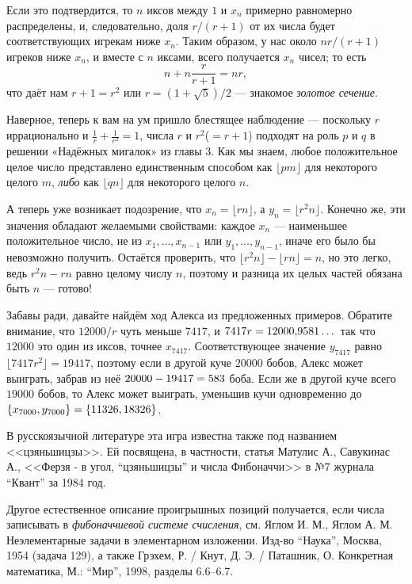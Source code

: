 Если это подтвердится, то $n$ иксов между $1$ и $x_n$ примерно равномерно распределены, и, следовательно, доля $r/(r + 1)$ от их числа будет соответствующих игрекам ниже $x_n$.
Таким образом, у нас около $nr/(r + 1)$ игреков ниже $x_n$, и вместе с $n$ иксами, всего получается $x_n$ чисел; то есть
\[n+n\frac{r}{r+1}=nr,\]
что даёт нам $r + 1 = r^2$ или $r = (1 + \sqrt{5})/2$ --- знакомое \emph{золотое сечение}.

Наверное, теперь к вам на ум пришло блестящее наблюдение --- поскольку $r$ иррационально и $\tfrac1r+\tfrac1{r^2}=1$, числа $r$ и $r^2$($= r + 1$) подходят на роль $p$ и $q$ в решении «Надёжных мигалок» из главы 3.
Как мы знаем, любое положительное целое число представлено единственным способом как $\lfloor pm\rfloor$ для некоторого целого $m$, \emph{либо} как $\lfloor qn\rfloor$ для некоторого целого $n$.

А теперь уже возникает подозрение, что $x_n=\lfloor rn\rfloor$, а $y_n=\lfloor r^2 n\rfloor$.
Конечно же, эти значения обладают желаемыми свойствами:
каждое $x_n$ --- наименьшее положительное число, не из $x_1, \dots , x_{n-1}$ или $y_1, \dots, y_{n-1}$, иначе его было бы невозможно получить.
Остаётся проверить, что $\lfloor r^2 n\rfloor - \lfloor rn\rfloor = n$, но это легко, ведь $r^2 n - rn$ равно целому числу $n$,
поэтому и разница их целых частей обязана быть $n$ --- готово!

Забавы ради, давайте найдём ход Алекса из предложенных примеров.
Обратите внимание, что $12 000/r$ чуть меньше $7417$, и $7417r \z= 12 000{,}9581\dots$ так что $12 000$ это один из иксов, точнее $x_{7417}$.
Соответствующее значение $y_{7417}$ равно $\lfloor 7417r^2\rfloor = 19 417$, поэтому если в другой куче $20 000$ бобов, Алекс может выиграть, забрав из неё $20 000 \z- 19 417 = 583$ боба.
Если же в другой куче всего $19 000$ бобов, то Алекс может выиграть, уменьшив кучи одновременно до $\{x_{7000}, y_{7000}\} \z= \{11 326, 18 326\}$.

\begin{addedbytheeditors}
В русскоязычной литературе эта игра известна также под названием <<цзяньшицзы>>. Ей посвящена, в частности, статья Матулис А., Савукинас А., <<Ферзя - в угол, ``цзяньшицзы'' и числа Фибоначчи>> в №7 журнала ``Квант'' за 1984 год.

Другое естественное описание проигрышных позиций получается, если числа записывать в \textit{фибоначчиевой системе счисления}, см. Яглом И. М., Яглом А. М. 
Неэлементарные задачи в элементарном изложении.
Изд-во ``Наука'', Москва, 1954 (задача 129), а также Грэхем, Р. / Кнут, Д. Э. / Паташник, О. 
Конкретная математика, М.: ``Мир'', 1998, разделы 6.6--6.7.\pr
\end{addedbytheeditors}